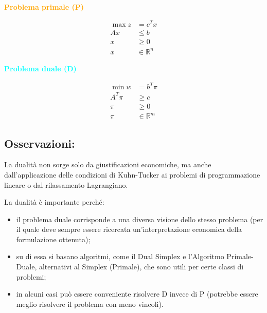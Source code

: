 \documentclass[a4paper, 11pt]{article}
\begin{document}
            \paragraph{}
            \noindent\begin{minipage}{0.48\textwidth}
            \noindent \textcolor{orange}{\textbf{Problema primale (P)}}

            \noindent \begin{align*}
            \max z &= c^T x \\
            Ax &\leq b \\
            x &\geq 0 \\
            x &\in \mathbb{R}^n
            \end{align*}
            \end{minipage}
            \hfill
            \begin{minipage}{0.48\textwidth}
            \noindent \textcolor{cyan}{\textbf{Problema duale (D)}}

            \noindent \begin{align*}
            \min w &= b^T \pi \\
            A^T \pi &\geq c \\
            \pi &\geq 0 \\
            \pi &\in \mathbb{R}^m
            \end{align*}
            \end{minipage}
        \subsection*{Osservazioni: }

        La dualità non sorge solo da giustificazioni economiche, ma anche dall'applicazione delle condizioni di Kuhn-Tucker ai problemi di programmazione lineare o dal rilassamento Lagrangiano.

        La dualità è importante perché:

        \begin{itemize}
            \item il problema duale corrisponde a una diversa visione dello stesso problema (per il quale deve sempre essere ricercata un'interpretazione economica della formulazione ottenuta);
            \item su di essa si basano algoritmi, come il Dual Simplex e l'Algoritmo Primale-Duale, alternativi al Simplex (Primale), che sono utili per certe classi di problemi;
            \item in alcuni casi può essere conveniente risolvere D invece di P (potrebbe essere meglio risolvere il problema con meno vincoli).
        \end{itemize}
\end{document}
